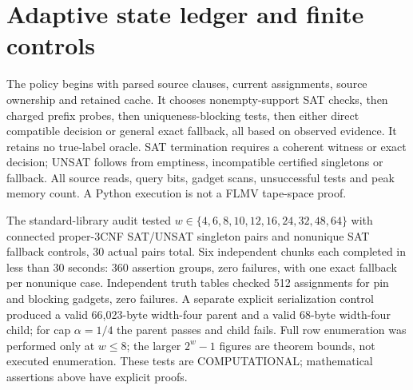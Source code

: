 \documentclass[11pt]{article}
\begin{document}
\section{Adaptive state ledger and finite controls}
The policy begins with parsed source clauses, current assignments, source ownership and retained cache. It chooses nonempty-support SAT checks, then charged prefix probes, then uniqueness-blocking tests, then either direct compatible decision or general exact fallback, all based on observed evidence. It retains no true-label oracle. SAT termination requires a coherent witness or exact decision; UNSAT follows from emptiness, incompatible certified singletons or fallback. All source reads, query bits, gadget scans, unsuccessful tests and peak memory count. A Python execution is not a FLMV tape-space proof.
\par\noindent The standard-library audit tested $w\in\{4,6,8,10,12,16,24,32,48,64\}$ with connected proper-3CNF SAT/UNSAT singleton pairs and nonunique SAT fallback controls, 30 actual pairs total. Six independent chunks each completed in less than 30 seconds: 360 assertion groups, zero failures, with one exact fallback per nonunique case. Independent truth tables checked 512 assignments for pin and blocking gadgets, zero failures. A separate explicit serialization control produced a valid 66,023-byte width-four parent and a valid 68-byte width-four child; for cap $\alpha=1/4$ the parent passes and child fails. Full row enumeration was performed only at $w\le8$; the larger $2^w-1$ figures are theorem bounds, not executed enumeration. These tests are COMPUTATIONAL; mathematical assertions above have explicit proofs.
\end{document}
